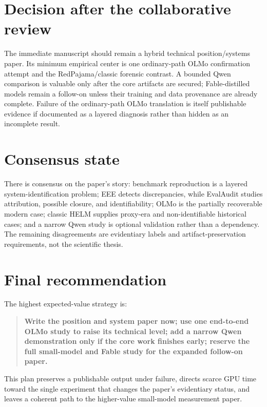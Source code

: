 \documentclass[11pt]{article}
\begin{document}
\section{Decision after the collaborative review}

The immediate manuscript should remain a hybrid technical position/systems paper.
Its minimum empirical center is one ordinary-path OLMo confirmation attempt and the
RedPajama/classic forensic contrast. A bounded Qwen comparison is valuable only
after the core artifacts are secured; Fable-distilled models remain a follow-on
unless their training and data provenance are already complete. Failure of the
ordinary-path OLMo translation is itself publishable evidence if documented as a
layered diagnosis rather than hidden as an incomplete result.

\section{Consensus state}

There is consensus on the paper's story: benchmark reproduction is a layered
system-identification problem; EEE detects discrepancies, while EvalAudit studies
attribution, possible closure, and identifiability; OLMo is the partially recoverable
modern case; classic HELM supplies proxy-era and non-identifiable historical cases;
and a narrow Qwen study is optional validation rather than a dependency. The remaining
disagreements are evidentiary labels and artifact-preservation requirements, not the
scientific thesis.

\section{Final recommendation}

The highest expected-value strategy is:

\begin{quote}
\textbf{Write the position and system paper now; use one end-to-end OLMo study to raise its technical level; add a narrow Qwen demonstration only if the core work finishes early; reserve the full small-model and Fable study for the expanded follow-on paper.}
\end{quote}

This plan preserves a publishable output under failure, directs scarce GPU time toward the single experiment that changes the paper's evidentiary status, and leaves a coherent path to the higher-value small-model measurement paper.
\end{document}
